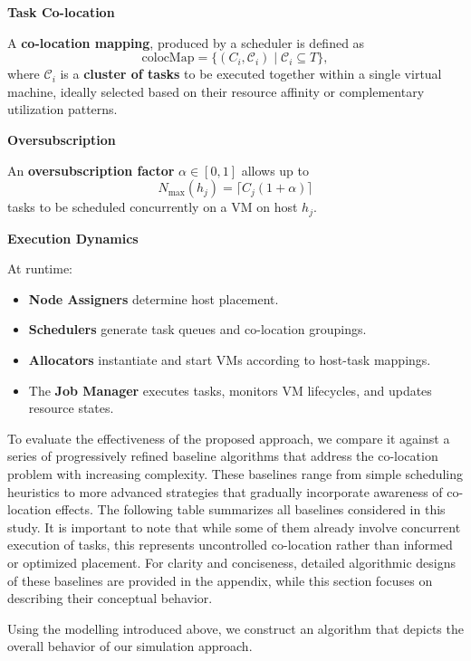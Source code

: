 \textbf{Task Co-location}

A \textbf{co-location mapping}, produced by a scheduler is defined as
\[
    \text{colocMap} = \{ (C_i, \mathcal{C}_i) \mid \mathcal{C}_i \subseteq T \},
\]
where $\mathcal{C}_i$ is a \textbf{cluster of tasks} to be executed together within a single virtual machine, ideally selected based on their resource affinity or complementary utilization patterns.

\textbf{Oversubscription}

An \textbf{oversubscription factor} $\alpha \in [0,1]$ allows up to
\[
    N_{\max}(h_j) = \lceil C_j (1 + \alpha) \rceil
\]
tasks to be scheduled concurrently on a VM on host $h_j$.


\textbf{Execution Dynamics}

At runtime:
\begin{itemize}
    \item \textbf{Node Assigners} determine host placement.
    \item \textbf{Schedulers} generate task queues and co-location groupings.
    \item \textbf{Allocators} instantiate and start VMs according to host-task mappings.
    \item The \textbf{Job Manager} executes tasks, monitors VM lifecycles, and updates resource states.
\end{itemize}

To evaluate the effectiveness of the proposed approach, we compare it against a series of progressively refined baseline algorithms that address the co-location problem with increasing complexity. These baselines range from simple scheduling heuristics to more advanced strategies that gradually incorporate awareness of co-location effects. The following table summarizes all baselines considered in this study. It is important to note that while some of them already involve concurrent execution of tasks, this represents uncontrolled co-location rather than informed or optimized placement. For clarity and conciseness, detailed algorithmic designs of these baselines are provided in the appendix, while this section focuses on describing their conceptual behavior.

Using the modelling introduced above, we construct an algorithm that depicts the overall behavior of our simulation approach.


